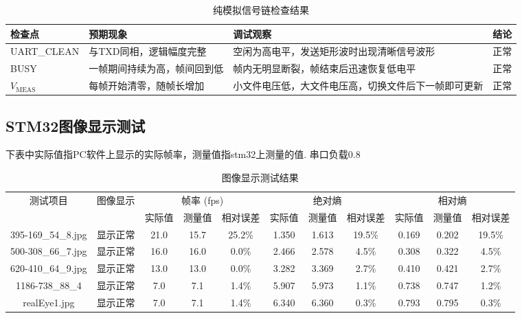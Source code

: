 \documentclass[a4paper]{article}
\newcommand{\VMEAS}{V_{\mathrm{MEAS}}}
\begin{document}
\begin{table}[H]
\centering
\caption{纯模拟信号链检查结果}
\small
\begin{tabularx}{\textwidth}{p{2.8cm}p{3.4cm}X p{1.4cm}}
\toprule
检查点 & 预期现象 & 调试观察 & 结论 \\
\midrule
UART\_CLEAN & 与TXD同相，逻辑幅度完整 & 空闲为高电平，发送矩形波时出现清晰信号波形 & 正常 \\
BUSY & 一帧期间持续为高，帧间回到低 & 帧内无明显断裂，帧结束后迅速恢复低电平 & 正常 \\
$\VMEAS$ & 每帧开始清零，随帧长增加 & 小文件电压低，大文件电压高，切换文件后下一帧即可更新 & 正常 \\
\bottomrule
\end{tabularx}
\end{table}

    
\subsection{STM32图像显示测试}

下表中实际值指PC软件上显示的实际帧率，测量值指stm32上测量的值.
串口负载0.8
\begin{table}[H]
\small
\centering
\caption{图像显示测试结果}
\begin{tabular}{|c|c|ccc|ccc|ccc|}
\hline
\multirow{2}{*}{测试项目} & \multirow{2}{*}{图像显示} & \multicolumn{3}{c|}{帧率 (fps)} & \multicolumn{3}{c|}{绝对熵} & \multicolumn{3}{c|}{相对熵} \\
\cline{3-11}
 &  & 实际值 & 测量值 & 相对误差 & 实际值 & 测量值 & 相对误差 & 实际值 & 测量值 & 相对误差 \\
\hline
 395-169\_54\_8.jpg& 显示正常  & 21.0  &15.7  & 25.2\%  & 1.350 & 1.613 & 19.5\%  & 0.169 & 0.202 & 19.5\%  \\
\hline
500-308\_66\_7.jpg& 显示正常  & 16.0  &16.0  & 0.0\%  & 2.466 & 2.578 & 4.5\%  & 0.308 & 0.322 & 4.5\%  \\
\hline
620-410\_64\_9.jpg& 显示正常  & 13.0  &13.0  & 0.0\%  & 3.282 & 3.369 & 2.7\%  & 0.410 & 0.421 & 2.7\%  \\
\hline
1186-738\_88\_4& 显示正常  & 7.0  &7.1  & 1.4\%  & 5.907 & 5.973 & 1.1\%  & 0.738 & 0.747 & 1.2\%  \\
\hline
realEye1.jpg& 显示正常  & 7.0  &7.1  & 1.4\%  & 6.340 & 6.360 & 0.3\%  & 0.793 & 0.795 & 0.3\%  \\
\hline
\end{tabular}
\end{table}
\end{document}
